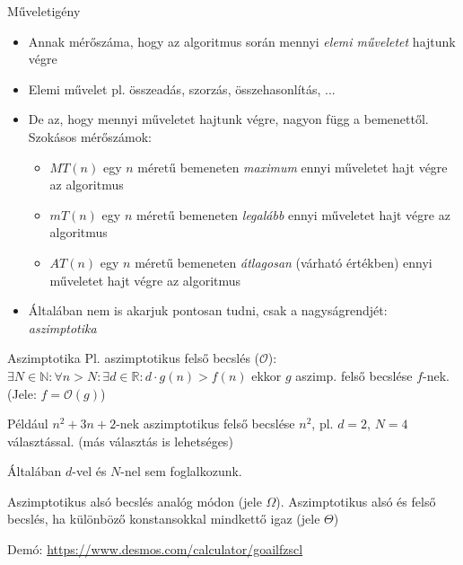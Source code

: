 \documentclass[hungarian]{beamer}
\begin{document}
\begin{frame}{Műveletigény}
\begin{itemize}
    \item Annak mérőszáma, hogy az algoritmus során mennyi \textit{elemi műveletet} hajtunk végre
    \item Elemi művelet pl. összeadás, szorzás, összehasonlítás, ...
    \item De az, hogy mennyi műveletet hajtunk végre, nagyon függ a bemenettől. Szokásos mérőszámok:
    \begin{itemize}
        \item $MT(n)$ egy $n$ méretű bemeneten \textit{maximum} ennyi műveletet hajt végre az algoritmus
        \item $mT(n)$ egy $n$ méretű bemeneten \textit{legalább} ennyi műveletet hajt végre az algoritmus
        \item $AT(n)$ egy $n$ méretű bemeneten \textit{átlagosan} (várható értékben) ennyi műveletet hajt végre az algoritmus
    \end{itemize}
    \item Általában nem is akarjuk pontosan tudni, csak a nagyságrendjét: \textit{aszimptotika}
\end{itemize}
\end{frame}

\begin{frame}{Aszimptotika}
Pl. aszimptotikus felső becslés ($\mathcal{O}$): $\exists N \in \mathbb{N}: \forall n>N: \exists d \in \mathbb{R}: d \cdot g(n) > f(n)$ ekkor $g$ aszimp. felső becslése $f$-nek. (Jele: $f = \mathcal{O}(g)$)

Például $n^2 + 3n + 2$-nek aszimptotikus felső becslése $n^2$, pl. $d = 2$, $N = 4$ választással. (más választás is lehetséges)

Általában $d$-vel és $N$-nel sem foglalkozunk.

Aszimptotikus alsó becslés analóg módon (jele $\Omega$). Aszimptotikus alsó és felső becslés, ha különböző konstansokkal mindkettő igaz (jele $\Theta$)


Demó: \href{https://www.desmos.com/calculator/goailfzscl}{https://www.desmos.com/calculator/goailfzscl}
\end{frame}
\end{document}

